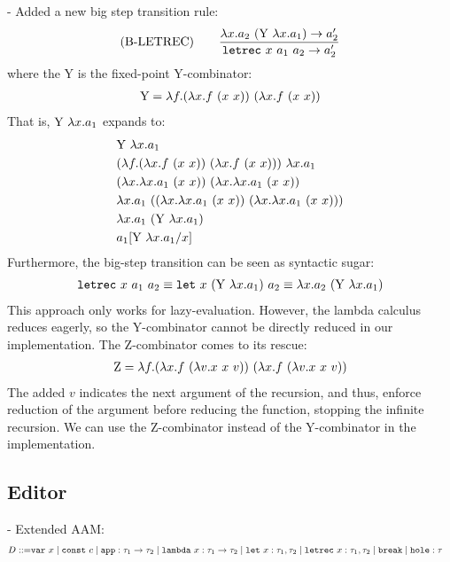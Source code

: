 \documentclass[10pt,a4paper,english]{article}
\newcommand\letin[3]{\texttt{let}~#1~#2~#3}
\newcommand\letrec[3]{\texttt{letrec}~#1~#2~#3}
\begin{document}
- Added a new big step transition rule:
\begin{align}
(\text{B-LETREC})\qquad
\frac{\app{\abs{x}{a_2}}{(\app{\text{Y}}{\abs{x}{a_1}})}\to a_2'}{\letrec{x}{a_1}{a_2} \to a_2'}
\end{align}
where the Y is the fixed-point Y-combinator:
\begin{align}
  \text{Y} = \lambda f.(\lambda x.f~(x~x))~(\lambda x.f~(x~x))
\end{align}
That is, $\text{Y}~\lambda x.a_1$ expands to:
\begin{align}
&\text{Y}~\lambda x.a_1\\
&(\lambda f.(\lambda x.f~(x~x))~(\lambda x.f~(x~x)))~\lambda x.a_1\\
&(\lambda x.\lambda x.a_1~(x~x))~(\lambda x.\lambda x.a_1~(x~x))\\
&\lambda x.a_1~((\lambda x.\lambda x.a_1~(x~x))~(\lambda x.\lambda x.a_1~(x~x)))\\
&\lambda x.a_1~(\text{Y}~\lambda x.a_1)\\
&a_1[\text{Y}~\lambda x.a_1/x]
\end{align}
Furthermore, the big-step transition can be seen as syntactic sugar:
\begin{align}
  \letrec{x}{a_1}{a_2} \equiv
  \letin{x}{(\app{\text{Y}}{\abs{x}{a_1}})}{a_2}\equiv
  \app{\abs{x}{a_2}}{(\app{\text{Y}}{\abs{x}{a_1}})}
\end{align}
This approach only works for lazy-evaluation. However, the lambda calculus
reduces eagerly, so the Y-combinator cannot be directly reduced in our
implementation. The Z-combinator comes to its rescue:
\begin{align}
  \text{Z} = \lambda f.(\lambda x.f~(\lambda v.x~x~v))~(\lambda x.f~(\lambda v.x~x~v))
\end{align}
The added $v$ indicates the next argument of the recursion, and thus, enforce
reduction of the argument before reducing the function, stopping the infinite
recursion. We can use the Z-combinator instead of the Y-combinator in the
implementation.

\subsection{Editor}

- Extended AAM:
\begin{align}
  D ::= &\texttt{var}~x
  \mid \texttt{const}~c
  \mid \texttt{app} : \tau_1\to\tau_2
  \mid \texttt{lambda}~x : \tau_1\to\tau_2
  \mid \texttt{let}~x : \tau_1,\tau_2
  \mid \texttt{letrec}~x : \tau_1,\tau_2
  \mid \texttt{break}
  \mid \texttt{hole} : \tau
\end{align}
\end{document}
